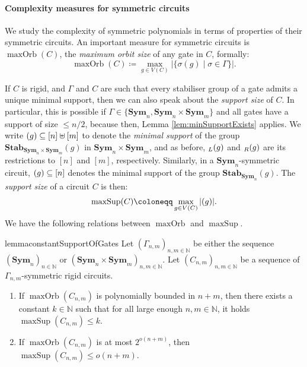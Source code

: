 \documentclass[11pt, DIV=15]{scrarticle}
\theoremstyle{definition}
\theoremstyle{plain}
\theoremstyle{remark}
\newcommand{\Sym}{\mathbf{Sym}}
\newcommand{\Stab}{\mathbf{Stab}}
\newcommand{\bbN}{\mathbb{N}}
\let\sup\relax
\DeclareMathOperator{\sup}{sup}
\DeclareMathOperator{\maxOrb}{maxOrb}
\DeclareMathOperator{\maxSup}{maxSup}
\begin{document}
\paragraph*{Complexity measures for symmetric circuits}
We study the complexity of symmetric polynomials in terms of properties of their symmetric circuits. 
An important measure for symmetric circuits is $\maxOrb(C)$, the \emph{maximum orbit size} of any gate in $C$, formally:
\[
\maxOrb(C) \coloneqq \max_{g \in V(C)} | \{ \sigma(g) \mid \sigma \in \Gamma \}  |.
\]

If $C$ is rigid, and $\Gamma$ and $C$ are such that every stabiliser
group of a gate admits a unique minimal support, then we can also
speak about the \emph{support size} of $C$. In particular, this is
possible if $\Gamma \in \{\Sym_n, \Sym_n \times
\Sym_m\}$ and all gates have a support of size $\leq n/2$, because then, Lemma \ref{lem:minSupportExists} applies.
We write $\sup(g) \subseteq [n] \uplus [m]$ to denote the \emph{minimal support} of the group $\Stab_{\Sym_n \times \Sym_m}(g)$ in $\Sym_n \times \Sym_m$, and as before, $\sup_L(g)$ and $\sup_R(g)$ are its restrictions to $[n]$ and $[m]$, respectively. Similarly, in a $\Sym_n$-symmetric circuit, $\sup(g) \subseteq [n]$ denotes the minimal support of the group $\Stab_{\Sym_n}(g)$.
The \emph{support size} of a circuit $C$ is then:	
\[
\maxSup(C) \coloneqq \max_{g \in V(C)} | \sup(g) |.
\]	
We have the following relations between $\maxOrb$ and $\maxSup$. 
\begin{restatable}{lemma}{constantSupportOfGates}\label{lem:constantSupportOfGates}
	Let $(\Gamma_{n,m})_{n,m \in \bbN}$ be either the sequence $(\Sym_n)_{n \in \bbN}$ or $(\Sym_{n} \times \Sym_{m})_{n,m \in \bbN}$.
	Let $(C_{n,m})_{n,m \in \bbN}$ be a sequence of $\Gamma_{n,m}$-symmetric rigid circuits.
	\begin{enumerate}
		\item If $\maxOrb(C_{n,m})$ is polynomially bounded in $n+m$, then there exists a constant $k \in \bbN$ such that for all large enough $n,m \in \bbN$, it holds $\maxSup(C_{n,m}) \leq k$.
		\item If $\maxOrb(C_{n,m})$ is at most $2^{o(n+m)}$, then $\maxSup(C_{n,m}) \leq o(n+m)$.
	\end{enumerate}	
\end{restatable}	
\end{document}
